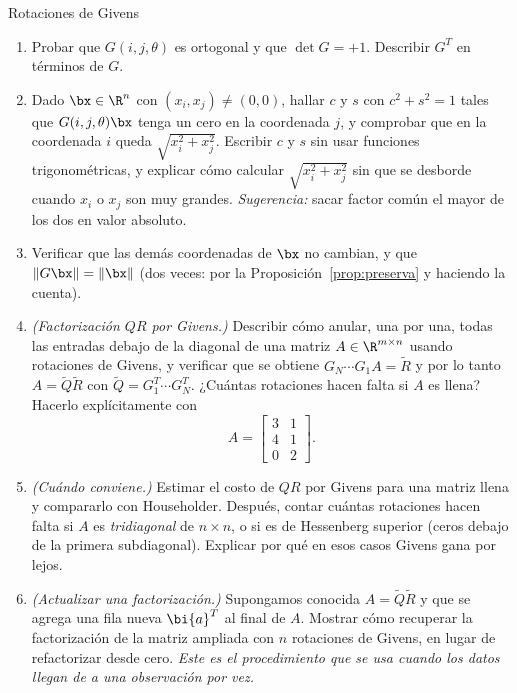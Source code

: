 \begin{entrega}{Rotaciones de Givens}\label{ent:givens}
\begin{enumerate}[label=\textbf{(\alph*)},itemsep=3pt,topsep=4pt]
\item Probar que $G(i,j,\theta)$ es ortogonal y que $\det G=+1$.
Describir $G^T$ en términos de $G$.

\item Dado $\bx\in\R^n$ con $(x_i,x_j)\neq(0,0)$, hallar $c$ y $s$ con
$c^2+s^2=1$ tales que $G(i,j,\theta)\bx$ tenga un cero en la coordenada $j$,
y comprobar que en la coordenada $i$ queda $\sqrt{x_i^2+x_j^2}$. Escribir
$c$ y $s$ sin usar funciones trigonométricas, y explicar cómo calcular
$\sqrt{x_i^2+x_j^2}$ sin que se desborde cuando $x_i$ o $x_j$ son muy
grandes. \emph{Sugerencia:} sacar factor común el mayor de los dos en
valor absoluto.

\item Verificar que las demás coordenadas de $\bx$ no cambian, y que
$\|G\bx\|=\|\bx\|$ (dos veces: por la Proposición~\ref{prop:preserva} y
haciendo la cuenta).

\item \emph{(Factorización $QR$ por Givens.)} Describir cómo anular, una por
una, todas las entradas debajo de la diagonal de una matriz
$A\in\R^{m\times n}$ usando rotaciones de Givens, y verificar que se obtiene
$G_N\cdots G_1A=\widetilde{R}$ y por lo tanto
$A=\widetilde{Q}\widetilde{R}$ con
$\widetilde{Q}=G_1^T\cdots G_N^T$. ¿Cuántas rotaciones hacen falta si $A$ es
llena? Hacerlo explícitamente con
\[
A=\begin{bmatrix} 3&1\\ 4&1\\ 0&2\end{bmatrix}.
\]

\item \emph{(Cuándo conviene.)} Estimar el costo de $QR$ por Givens para una
matriz llena y compararlo con Householder. Después, contar cuántas rotaciones
hacen falta si $A$ es \emph{tridiagonal} de $n\times n$, o si es de Hessenberg
superior (ceros debajo de la primera subdiagonal). Explicar por qué en esos
casos Givens gana por lejos.

\item \emph{(Actualizar una factorización.)} Supongamos conocida
$A=\widetilde{Q}\widetilde{R}$ y que se agrega una fila nueva $\bi{a}^T$ al
final de $A$. Mostrar cómo recuperar la factorización de la matriz ampliada
con $n$ rotaciones de Givens, en lugar de refactorizar desde cero. \emph{Este
es el procedimiento que se usa cuando los datos llegan de a una observación
por vez.}
\end{enumerate}

\medskip
{}
\end{entrega}

